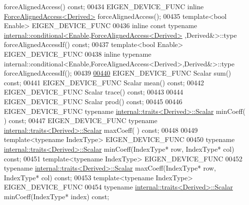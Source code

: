 \begin{DoxyCode}
      forceAlignedAccess() \textcolor{keyword}{const};
00434     EIGEN\_DEVICE\_FUNC \textcolor{keyword}{inline} \hyperlink{group___core___module_class_eigen_1_1_force_aligned_access}{ForceAlignedAccess<Derived>} forceAlignedAccess();
00435     \textcolor{keyword}{template}<\textcolor{keywordtype}{bool} Enable> EIGEN\_DEVICE\_FUNC
00436     \textcolor{keyword}{inline} \textcolor{keyword}{const} \textcolor{keyword}{typename} 
      \hyperlink{struct_eigen_1_1internal_1_1conditional}{internal::conditional<Enable,ForceAlignedAccess<Derived>}
      ,Derived&>::type forceAlignedAccessIf() \textcolor{keyword}{const};
00437     \textcolor{keyword}{template}<\textcolor{keywordtype}{bool} Enable> EIGEN\_DEVICE\_FUNC
00438     \textcolor{keyword}{inline} \textcolor{keyword}{typename} internal::conditional<Enable,ForceAlignedAccess<Derived>,Derived&>::type 
      forceAlignedAccessIf();
00439 
\hyperlink{group___core___module_a84e5b32db338ec72142ac66fa9bc4786}{00440}     EIGEN\_DEVICE\_FUNC Scalar sum() \textcolor{keyword}{const};
00441     EIGEN\_DEVICE\_FUNC Scalar mean() \textcolor{keyword}{const};
00442     EIGEN\_DEVICE\_FUNC Scalar trace() \textcolor{keyword}{const};
00443 
00444     EIGEN\_DEVICE\_FUNC Scalar prod() \textcolor{keyword}{const};
00445 
00446     EIGEN\_DEVICE\_FUNC \textcolor{keyword}{typename} \hyperlink{struct_eigen_1_1internal_1_1traits}{internal::traits<Derived>::Scalar} minCoeff(
      ) \textcolor{keyword}{const};
00447     EIGEN\_DEVICE\_FUNC \textcolor{keyword}{typename} \hyperlink{struct_eigen_1_1internal_1_1traits}{internal::traits<Derived>::Scalar} maxCoeff(
      ) \textcolor{keyword}{const};
00448 
00449     \textcolor{keyword}{template}<\textcolor{keyword}{typename} IndexType> EIGEN\_DEVICE\_FUNC
00450     \textcolor{keyword}{typename} \hyperlink{struct_eigen_1_1internal_1_1traits}{internal::traits<Derived>::Scalar} minCoeff(IndexType* row, 
      IndexType* col) \textcolor{keyword}{const};
00451     \textcolor{keyword}{template}<\textcolor{keyword}{typename} IndexType> EIGEN\_DEVICE\_FUNC
00452     \textcolor{keyword}{typename} \hyperlink{struct_eigen_1_1internal_1_1traits}{internal::traits<Derived>::Scalar} maxCoeff(IndexType* row, 
      IndexType* col) \textcolor{keyword}{const};
00453     \textcolor{keyword}{template}<\textcolor{keyword}{typename} IndexType> EIGEN\_DEVICE\_FUNC
00454     \textcolor{keyword}{typename} \hyperlink{struct_eigen_1_1internal_1_1traits}{internal::traits<Derived>::Scalar} minCoeff(IndexType* index) \textcolor{keyword}{
      const};

\end{DoxyCode}
